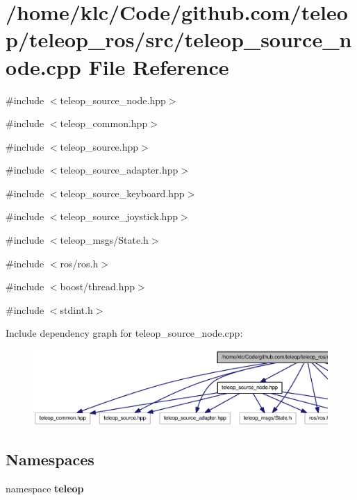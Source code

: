 \section{/home/klc/Code/github.com/teleop/teleop\_\-ros/src/teleop\_\-source\_\-node.cpp File Reference}
\label{teleop__source__node_8cpp}
{\ttfamily \#include $<$teleop\_\-source\_\-node.hpp$>$}\par
{\ttfamily \#include $<$teleop\_\-common.hpp$>$}\par
{\ttfamily \#include $<$teleop\_\-source.hpp$>$}\par
{\ttfamily \#include $<$teleop\_\-source\_\-adapter.hpp$>$}\par
{\ttfamily \#include $<$teleop\_\-source\_\-keyboard.hpp$>$}\par
{\ttfamily \#include $<$teleop\_\-source\_\-joystick.hpp$>$}\par
{\ttfamily \#include $<$teleop\_\-msgs/State.h$>$}\par
{\ttfamily \#include $<$ros/ros.h$>$}\par
{\ttfamily \#include $<$boost/thread.hpp$>$}\par
{\ttfamily \#include $<$stdint.h$>$}\par
Include dependency graph for teleop\_\-source\_\-node.cpp:
\nopagebreak
\begin{figure}[H]
\begin{center}
\leavevmode
\includegraphics[width=400pt]{teleop__source__node_8cpp__incl}
\end{center}
\end{figure}
\subsection*{Namespaces}
\begin{DoxyCompactItemize}
\item 
namespace {\bf teleop}
\end{DoxyCompactItemize}

